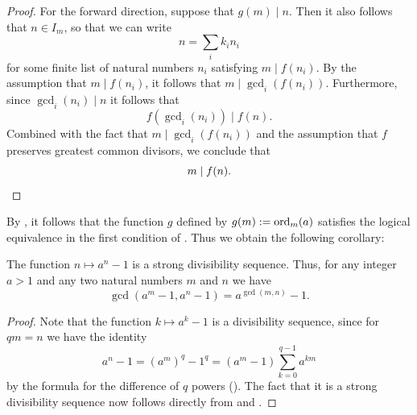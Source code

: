 \begin{proof}
  For the forward direction, suppose that $g(m)\mid n$. Then it also follows that $n\in I_m$, so that we can write
  \begin{equation*}
    n=\sum_i k_in_i
  \end{equation*}
  for some finite list of natural numbers $n_i$ satisfying $m\mid f(n_i)$. By the assumption that $m\mid f(n_i)$, it follows that $m\mid\gcd_i(f(n_i))$. Furthermore, since $\gcd_i(n_i)\mid n$ it follows that
  \begin{equation*}
    f(\gcd\nolimits_i(n_i))\mid f(n).
  \end{equation*}
  Combined with the fact that $m\mid\gcd_i(f(n_i))$ and the assumption that $f$ preserves greatest common divisors, we conclude that
  \begin{equation*}
    m\mid f(n).\qedhere
  \end{equation*}
\end{proof}

By , it follows that the function $g$ defined by $g(m):=\operatorname{ord}_m(a)$ satisfies the logical equivalence in the first condition of . Thus we obtain the following corollary:

\begin{corollary}
  The function $n\mapsto a^n-1$ is a strong divisibility sequence. Thus, for any integer $a>1$ and any two natural numbers $m$ and $n$ we have
  \begin{equation*}
    \gcd(a^m-1,a^n-1)=a^{\gcd(m,n)}-1.
  \end{equation*}
\end{corollary}

\begin{proof}
  Note that the function $k\mapsto a^k-1$ is a divisibility sequence, since for $qm=n$ we have the identity
  \begin{equation*}
    a^n-1=(a^m)^q-1^q=(a^m-1)\sum_{k=0}^{q-1}a^{km}
  \end{equation*}
  by the formula for the difference of $q$\supth{} powers (). The fact that it is a strong divisibility sequence now follows directly from  and .
\end{proof}

